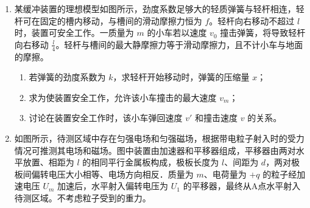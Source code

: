 \documentclass[\gkver]{gaokaozhenti}
\begin{document}
\begin{enumerate}
\item
某缓冲装置的理想模型如图所示，劲度系数足够大的轻质弹簧与轻杆相连，轻杆可在固定的槽内移动，与槽间的滑动摩擦力恒为 $f$。轻杆向右移动不超过 $l$ 时，装置可安全工作。一质量为 $m$ 的小车若以速度 $v_{0}$ 撞击弹簧，将导致轻杆向右移动 $\frac{l}{4}$。轻杆与槽间的最大静摩擦力等于滑动摩擦力，且不计小车与地面的摩擦。
\begin{enumerate}
	\item
	若弹簧的劲度系数为 $k$，求轻杆开始移动时，弹簧的压缩量 $x$；
	\item
	求为使装置安全工作，允许该小车撞击的最大速度 $v_{m}$；
	\item
	讨论在装置安全工作时，该小车弹回速度 $v'$ 和撞击速度 $v$ 的关系。
\end{enumerate}

\item
如图所示，待测区域中存在匀强电场和匀强磁场，根据带电粒子射入时的受力情况可推测其电场和磁场。图中装置由加速器和平移器组成，平移器由两对水平放置、相距为 $l$ 的相同平行金属板构成，极板长度为 $l$、间距为 $d$，两对极板间偏转电压大小相等、电场方向相反．质量为 $m$、电荷量为 $+q$ 的粒子经加速电压 $U_{m}$ 加速后，水平射入偏转电压为 $U_{1}$ 的平移器，最终从A点水平射入待测区域。不考虑粒子受到的重力。


\end{enumerate}
\end{document}
